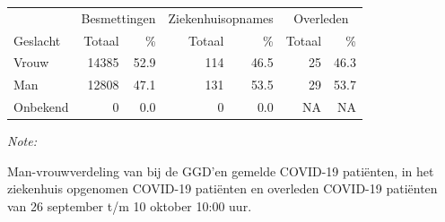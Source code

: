 \documentclass[
  english,
  man,floatsintext]{apa6}
\begin{document}
\begin{table}
\centering\begingroup\fontsize{11}{13}\selectfont

\begin{threeparttable}
\begin{tabular}{lrrrrrr}
\toprule
\multicolumn{1}{c}{ } & \multicolumn{2}{c}{Besmettingen} & \multicolumn{2}{c}{Ziekenhuisopnames} & \multicolumn{2}{c}{Overleden} \\
\cmidrule(l{3pt}r{3pt}){2-3} \cmidrule(l{3pt}r{3pt}){4-5} \cmidrule(l{3pt}r{3pt}){6-7}
Geslacht & Totaal & \% & Totaal & \% & Totaal & \%\\
\midrule
Vrouw & 14385 & 52.9 & 114 & 46.5 & 25 & 46.3\\
Man & 12808 & 47.1 & 131 & 53.5 & 29 & 53.7\\
Onbekend & 0 & 0.0 & 0 & 0.0 & NA & NA\\
\bottomrule
\end{tabular}
\begin{tablenotes}
\item \textit{Note: } 
\item Man-vrouwverdeling van bij de GGD’en gemelde COVID-19 patiënten, in het ziekenhuis opgenomen COVID-19 patiënten en overleden COVID-19 patiënten van 26 september t/m 10 oktober 10:00 uur.
\end{tablenotes}
\end{threeparttable}
\endgroup{}
\end{table}
\newpage
\end{document}
